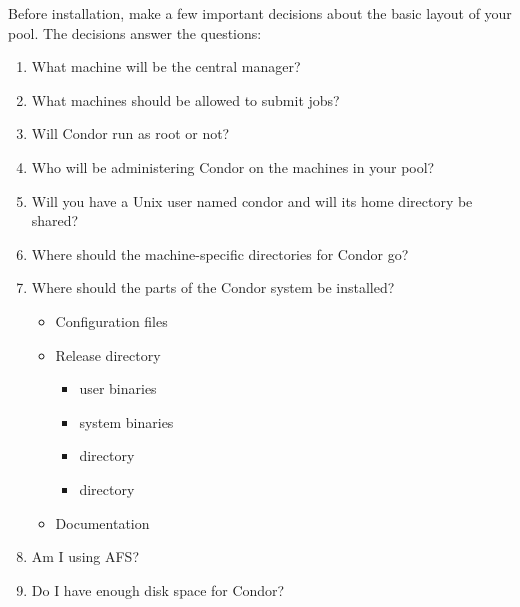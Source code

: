 Before installation, make a few important
decisions about the basic layout of your pool.
The decisions answer the questions:

\begin{enumerate}
\item What machine will be the central manager?
\item What machines should be allowed to submit jobs?
\item Will Condor run as root or not?
\item Who will be administering Condor on the machines in your pool?
\item Will you have a Unix user named condor and will its home directory be
   shared? 
\item Where should the machine-specific directories for Condor go?
\item Where should the parts of the Condor system be installed? 
	\begin{itemize}
	\item Configuration files
	\item Release directory
		\begin{itemize}
		\item user binaries
		\item system binaries 
		\item {} directory
	  	\item {} directory
		\end{itemize}
	\item Documentation
	\end{itemize}
\item Am I using AFS?
\item Do I have enough disk space for Condor?
\end{enumerate}

